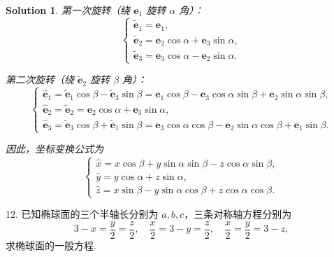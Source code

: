 \documentclass[a4paper,12pt]{article}
\newtheorem*{sol}{Solution}
\begin{document}
\begin{sol}
    第一次旋转（绕 $\boldsymbol{e}_1$ 旋转 $\alpha$ 角）：
    $$\begin{cases}
            \tilde{\boldsymbol{e}}_1 = \boldsymbol{e}_1,                                        \\
            \tilde{\boldsymbol{e}}_2 = \boldsymbol{e}_2\cos\alpha + \boldsymbol{e}_3\sin\alpha, \\
            \tilde{\boldsymbol{e}}_3 = \boldsymbol{e}_3\cos\alpha - \boldsymbol{e}_2\sin\alpha.
        \end{cases}$$

    第二次旋转（绕 $\tilde{\boldsymbol{e}}_2$ 旋转 $\beta$ 角）：
    $$\begin{cases}
            \hat{\boldsymbol{e}}_1 = \tilde{\boldsymbol{e}}_1\cos\beta - \tilde{\boldsymbol{e}}_3\sin\beta
            = \boldsymbol{e}_1\cos\beta - \boldsymbol{e}_3\cos\alpha\sin\beta + \boldsymbol{e}_2\sin\alpha\sin\beta, \\
            \hat{\boldsymbol{e}}_2 = \tilde{\boldsymbol{e}}_2
            = \boldsymbol{e}_2\cos\alpha + \boldsymbol{e}_3\sin\alpha,                                               \\
            \hat{\boldsymbol{e}}_3 = \tilde{\boldsymbol{e}}_3\cos\beta + \tilde{\boldsymbol{e}}_1\sin\beta
            = \boldsymbol{e}_3\cos\alpha\cos\beta - \boldsymbol{e}_2\sin\alpha\cos\beta + \boldsymbol{e}_1\sin\beta.
        \end{cases}$$

    因此，坐标变换公式为
    $$\begin{cases}
            \hat{x} = x\cos\beta + y\sin\alpha\sin\beta - z\cos\alpha\sin\beta, \\
            \hat{y} = y\cos\alpha + z\sin\alpha,                                \\
            \hat{z} = x\sin\beta - y\sin\alpha\cos\beta + z\cos\alpha\cos\beta.
        \end{cases}$$
\end{sol}

12. 已知椭球面的三个半轴长分别为 $a,b,c$，三条对称轴方程分别为
$$3 - x = \frac{y}{2} = \frac{z}{2}, \quad \frac{x}{2} = 3 - y = \frac{z}{2}, \quad \frac{x}{2} = \frac{y}{2} = 3 - z,$$
求椭球面的一般方程.
\end{document}
